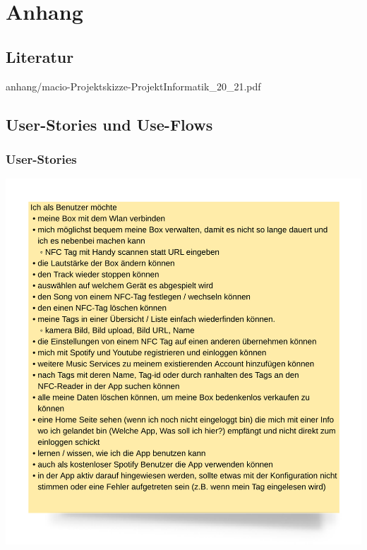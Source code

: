 \documentclass[10pt, a4paper]{article}
\begin{document}
\begin{onehalfspace}
\end{onehalfspace}
\newpage
\appendix
\section{Anhang}
\subsection{Literatur}
  \printbibliography[title={~}]


    {anhang/macio-Projektskizze-ProjektInformatik_20_21.pdf}

\subsection{User-Stories und Use-Flows}
  \label{FlowCharts}
  \label{anhang:lucidchart}
  \subsubsection*{User-Stories}
  \includegraphics[width=\textwidth]{user stories.png}
  \newpage
\end{document}
